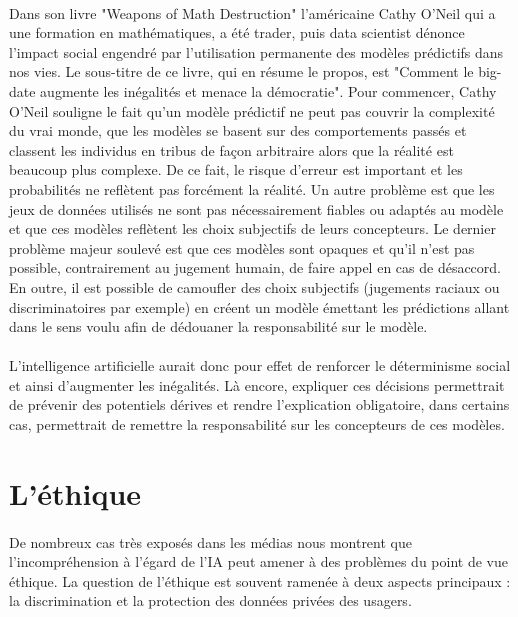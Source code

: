 \paragraph{}Dans son livre "Weapons of Math Destruction" \cite{mathDestruction} l'américaine Cathy O'Neil qui a une formation en mathématiques, a été trader, puis data scientist dénonce l'impact social engendré par l'utilisation permanente des modèles prédictifs dans nos vies. Le sous-titre de ce livre, qui en résume le propos, est "Comment le big-date augmente les inégalités et menace la démocratie". Pour commencer, Cathy O'Neil souligne le fait qu'un modèle prédictif ne peut pas couvrir la complexité du vrai monde, que les modèles se basent sur des comportements passés et classent les individus en tribus de façon arbitraire alors que la réalité est beaucoup plus complexe. De ce fait, le risque d'erreur est important et les probabilités ne reflètent pas forcément la réalité. Un autre problème est que les jeux de données utilisés ne sont pas nécessairement fiables ou adaptés au modèle et que ces modèles reflètent les choix subjectifs de leurs concepteurs. Le dernier problème majeur soulevé est que ces modèles sont opaques et qu'il n'est pas possible, contrairement au jugement humain, de faire appel en cas de désaccord. En outre, il est possible de camoufler des choix subjectifs (jugements raciaux ou discriminatoires par exemple) en créent un modèle émettant les prédictions allant dans le sens voulu afin de dédouaner la responsabilité sur le modèle.

\paragraph{}L'intelligence artificielle aurait donc pour effet de renforcer le déterminisme social et ainsi d'augmenter les inégalités. Là encore, expliquer ces décisions permettrait de prévenir des potentiels dérives et rendre l'explication obligatoire, dans certains cas, permettrait de remettre la responsabilité sur les concepteurs de ces modèles.

\section{L'éthique}
\paragraph{}De nombreux cas très exposés dans les médias nous montrent que l'incompréhension à l'égard de l'IA peut amener à des problèmes du point de vue éthique. La question de l'éthique est souvent ramenée à deux aspects principaux : la discrimination et la protection des données privées des usagers.

